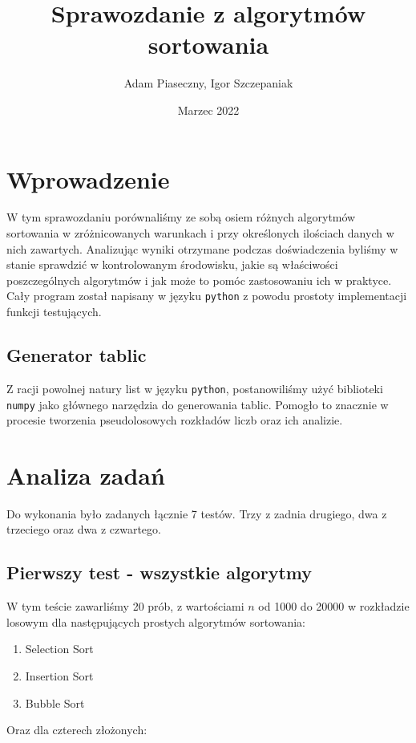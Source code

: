 \documentclass{article}
\title{Sprawozdanie z algorytmów sortowania}
\author{Adam Piaseczny, Igor Szczepaniak}
\date{Marzec 2022}
\begin{document}
\maketitle
\pagebreak

\tableofcontents
\pagebreak

\section{Wprowadzenie}
W tym sprawozdaniu porównaliśmy ze sobą osiem różnych algorytmów sortowania w zróżnicowanych warunkach i przy określonych ilościach danych w nich zawartych. Analizując wyniki otrzymane podczas doświadczenia byliśmy w stanie sprawdzić w kontrolowanym środowisku, jakie są właściwości poszczególnych algorytmów i jak może to pomóc zastosowaniu ich w praktyce. Cały program został napisany w języku \verb+python+ z powodu prostoty implementacji funkcji testujących.
\subsection{Generator tablic}

Z racji powolnej natury list w języku \verb+python+, postanowiliśmy użyć biblioteki \verb+numpy+ jako głównego narzędzia do generowania tablic. Pomogło to znacznie w procesie tworzenia pseudolosowych rozkładów liczb oraz ich analizie.

\section{Analiza zadań}

Do wykonania było zadanych łącznie 7 testów. Trzy z zadnia drugiego, dwa z trzeciego oraz dwa z czwartego.

\subsection{Pierwszy test - wszystkie algorytmy}

W tym teście zawarliśmy 20 prób, z wartościami $n$ od 1000 do 20000 w rozkładzie losowym dla następujących prostych algorytmów sortowania:

\begin{enumerate}
    \item Selection Sort
    \item Insertion Sort
    \item Bubble Sort
\end{enumerate}

Oraz dla czterech złożonych:
\end{document}
